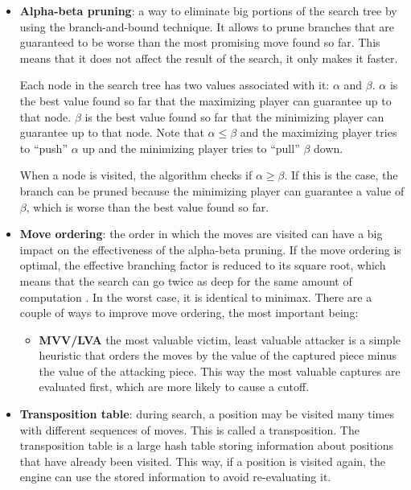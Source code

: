 \begin{itemize}
\item \textbf{Alpha-beta pruning}: a way to eliminate big portions of the search tree by using the branch-and-bound technique. It allows to prune branches that are guaranteed to be worse than the most promising move found so far. This means that it does not affect the result of the search, it only makes it faster.

Each node in the search tree has two values associated with it: $\alpha$ and $\beta$. $\alpha$ is the best value found so far that the maximizing player can guarantee up to that node. $\beta$ is the best value found so far that the minimizing player can guarantee up to that node. Note that $\alpha \le \beta$ and the maximizing player tries to \enquote{push} $\alpha$ up and the minimizing player tries to \enquote{pull} $\beta$ down.

When a node is visited, the algorithm checks if $\alpha \ge \beta$. If this is the case, the branch can be pruned because the minimizing player can guarantee a value of $\beta$, which is worse than the best value found so far.

\item \textbf{Move ordering}: the order in which the moves are visited can have a big impact on the effectiveness of the alpha-beta pruning. If the move ordering is optimal, the effective branching factor is reduced to its square root, which means that the search can go twice as deep for the same amount of computation \cite[section 5.3.1]{ai_modern_approach}. In the worst case, it is identical to minimax. There are a couple of ways to improve move ordering, the most important being:
\begin{itemize}
\item \textbf{MVV/LVA} the most valuable victim, least valuable attacker is a simple heuristic that orders the moves by the value of the captured piece minus the value of the attacking piece. This way the most valuable captures are evaluated first, which are more likely to cause a cutoff.
\end{itemize}

\item \textbf{Transposition table}: during search, a position may be visited many times with different sequences of moves. This is called a transposition. The transposition table is a large hash table storing information about positions that have already been visited. This way, if a position is visited again, the engine can use the stored information to avoid re-evaluating it.


\end{itemize}
